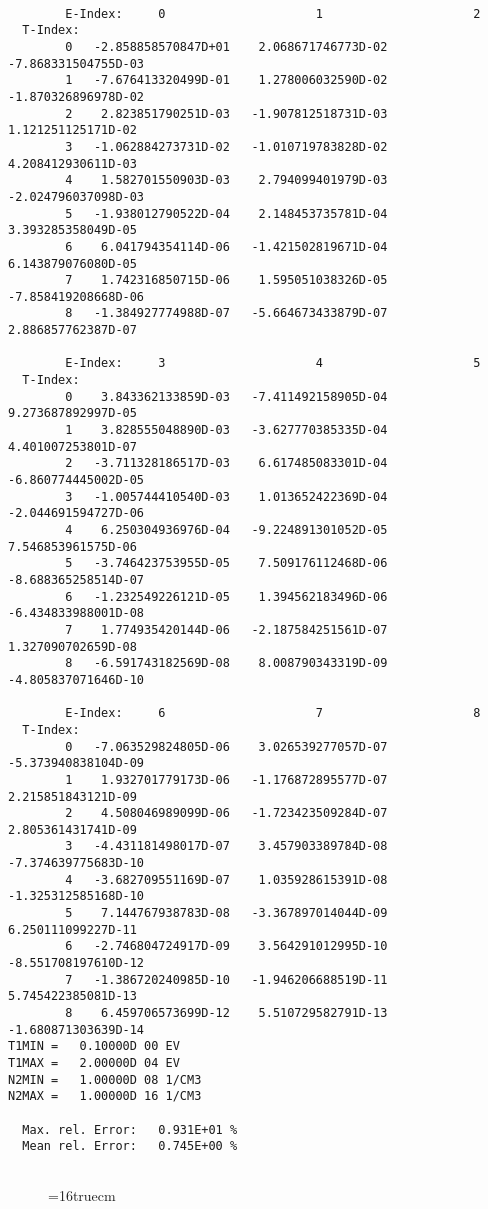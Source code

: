 \documentclass[12pt,dvipdfmx]{article}
\begin{document}
\begin{small}\begin{verbatim}

        E-Index:     0                     1                     2
  T-Index:
        0   -2.858858570847D+01    2.068671746773D-02   -7.868331504755D-03
        1   -7.676413320499D-01    1.278006032590D-02   -1.870326896978D-02
        2    2.823851790251D-03   -1.907812518731D-03    1.121251125171D-02
        3   -1.062884273731D-02   -1.010719783828D-02    4.208412930611D-03
        4    1.582701550903D-03    2.794099401979D-03   -2.024796037098D-03
        5   -1.938012790522D-04    2.148453735781D-04    3.393285358049D-05
        6    6.041794354114D-06   -1.421502819671D-04    6.143879076080D-05
        7    1.742316850715D-06    1.595051038326D-05   -7.858419208668D-06
        8   -1.384927774988D-07   -5.664673433879D-07    2.886857762387D-07

        E-Index:     3                     4                     5
  T-Index:
        0    3.843362133859D-03   -7.411492158905D-04    9.273687892997D-05
        1    3.828555048890D-03   -3.627770385335D-04    4.401007253801D-07
        2   -3.711328186517D-03    6.617485083301D-04   -6.860774445002D-05
        3   -1.005744410540D-03    1.013652422369D-04   -2.044691594727D-06
        4    6.250304936976D-04   -9.224891301052D-05    7.546853961575D-06
        5   -3.746423753955D-05    7.509176112468D-06   -8.688365258514D-07
        6   -1.232549226121D-05    1.394562183496D-06   -6.434833988001D-08
        7    1.774935420144D-06   -2.187584251561D-07    1.327090702659D-08
        8   -6.591743182569D-08    8.008790343319D-09   -4.805837071646D-10

        E-Index:     6                     7                     8
  T-Index:
        0   -7.063529824805D-06    3.026539277057D-07   -5.373940838104D-09
        1    1.932701779173D-06   -1.176872895577D-07    2.215851843121D-09
        2    4.508046989099D-06   -1.723423509284D-07    2.805361431741D-09
        3   -4.431181498017D-07    3.457903389784D-08   -7.374639775683D-10
        4   -3.682709551169D-07    1.035928615391D-08   -1.325312585168D-10
        5    7.144767938783D-08   -3.367897014044D-09    6.250111099227D-11
        6   -2.746804724917D-09    3.564291012995D-10   -8.551708197610D-12
        7   -1.386720240985D-10   -1.946206688519D-11    5.745422385081D-13
        8    6.459706573699D-12    5.510729582791D-13   -1.680871303639D-14
T1MIN =   0.10000D 00 EV
T1MAX =   2.00000D 04 EV
N2MIN =   1.00000D 08 1/CM3
N2MAX =   1.00000D 16 1/CM3

  Max. rel. Error:   0.931E+01 %
  Mean rel. Error:   0.745E+00 %


\end{verbatim}\end{small}
\begin{figure} \label{2.1.8FU}
\epsfxsize=16truecm
\end{figure}
\newpage
\end{document}
